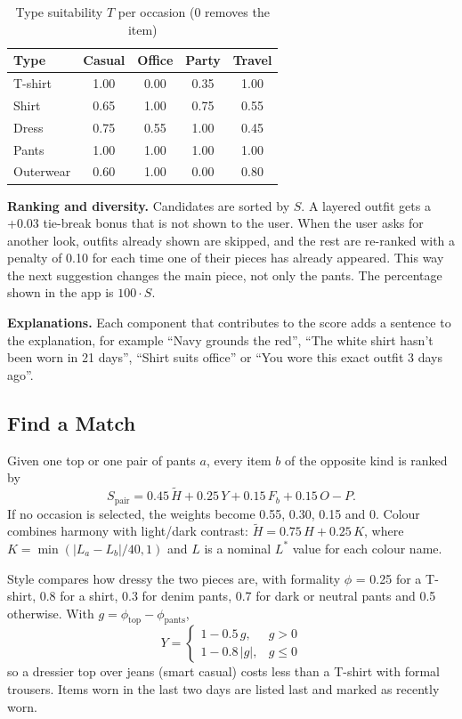 \documentclass[conference]{IEEEtran}
\begin{document}
\begin{table}[t]
\caption{Type suitability $T$ per occasion (0 removes the item)}
\label{tab:occasion}
\centering
\begin{tabular}{lcccc}
\toprule
Type & Casual & Office & Party & Travel \\
\midrule
T-shirt   & 1.00 & 0.00 & 0.35 & 1.00 \\
Shirt     & 0.65 & 1.00 & 0.75 & 0.55 \\
Dress     & 0.75 & 0.55 & 1.00 & 0.45 \\
Pants     & 1.00 & 1.00 & 1.00 & 1.00 \\
Outerwear & 0.60 & 1.00 & 0.00 & 0.80 \\
\bottomrule
\end{tabular}
\end{table}

\textbf{Ranking and diversity.} Candidates are sorted by $S$. A layered outfit gets a +0.03 tie-break bonus that is not shown to the user. When the user asks for another look, outfits already shown are skipped, and the rest are re-ranked with a penalty of 0.10 for each time one of their pieces has already appeared. This way the next suggestion changes the main piece, not only the pants. The percentage shown in the app is $100\cdot S$.

\textbf{Explanations.} Each component that contributes to the score adds a sentence to the explanation, for example ``Navy grounds the red'', ``The white shirt hasn't been worn in 21 days'', ``Shirt suits office'' or ``You wore this exact outfit 3 days ago''.

\subsection{Find a Match}
Given one top or one pair of pants $a$, every item $b$ of the opposite kind is ranked by
\begin{equation}
  S_{\text{pair}} = 0.45\,\tilde H + 0.25\,Y + 0.15\,F_b + 0.15\,O - P.
\end{equation}
If no occasion is selected, the weights become 0.55, 0.30, 0.15 and 0. Colour combines harmony with light/dark contrast: $\tilde H = 0.75\,H + 0.25\,K$, where $K=\min(|L_a-L_b|/40,1)$ and $L$ is a nominal $L^*$ value for each colour name.

Style compares how dressy the two pieces are, with formality $\phi$ = 0.25 for a T-shirt, 0.8 for a shirt, 0.3 for denim pants, 0.7 for dark or neutral pants and 0.5 otherwise. With $g=\phi_{\text{top}}-\phi_{\text{pants}}$,
\begin{equation}
  Y = \begin{cases} 1 - 0.5\,g, & g>0\\ 1 - 0.8\,|g|, & g\le 0 \end{cases}
\end{equation}
so a dressier top over jeans (smart casual) costs less than a T-shirt with formal trousers. Items worn in the last two days are listed last and marked as recently worn.
\end{document}
